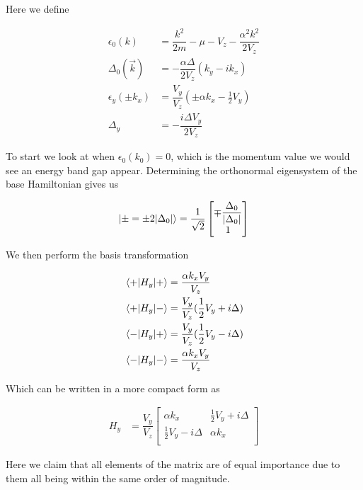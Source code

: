 Here we define

\begin{align}
  \epsilon_0(k) &= \dfrac{k^2}{2m}-\mu-V_z-\dfrac{\alpha^2k^2}{2V_z} \\
  \Delta_0(\vec{k}) &= -\dfrac{\alpha\Delta}{2V_z}(k_y-ik_x) \\
  \epsilon_y(\pm k_x) &= \dfrac{V_y}{V_z}(\pm\alpha k_x -\frac{1}{2}V_y) \\
  \Delta_y &= -\dfrac{i\Delta V_y}{2V_z}
\end{align}

To start we look at when $\epsilon_0(k_0) = 0$, which is the momentum value we would see an energy band gap appear. Determining the orthonormal eigensystem of the base Hamiltonian gives us 

\begin{align}
  \ket{\pm =\pm 2|\Delta_0|} = \dfrac{1}{\sqrt{2}}
    \begin{bmatrix}
      \mp\dfrac{\Delta_0}{|\Delta_0|} \\
      1
    \end{bmatrix}
\end{align}

We then perform the basis transformation 

\begin{align}
  \matrixelement{+}{H_y}{+} &= \dfrac{\alpha k_x V_y}{V_z} \\
  \matrixelement{+}{H_y}{-} &= \dfrac{V_y}{V_z}(\frac{1}{2}V_y+i\Delta) \\
  \matrixelement{-}{H_y}{+} &= \dfrac{V_y}{V_z}(\frac{1}{2}V_y-i\Delta) \\
  \matrixelement{-}{H_y}{-} &= \dfrac{\alpha k_x V_y}{V_z}
\end{align}

Which can be written in a more compact form as

\begin{align}
  H_y &= \dfrac{V_y}{V_z} 
  \begin{bmatrix}
    \alpha k_x & \frac{1}{2}V_y+i\Delta \\
    \frac{1}{2}V_y-i\Delta & \alpha k_x \\
  \end{bmatrix} 
\end{align}

Here we claim that all elements of the matrix are of equal importance due to them all being within the same order of magnitude. 
